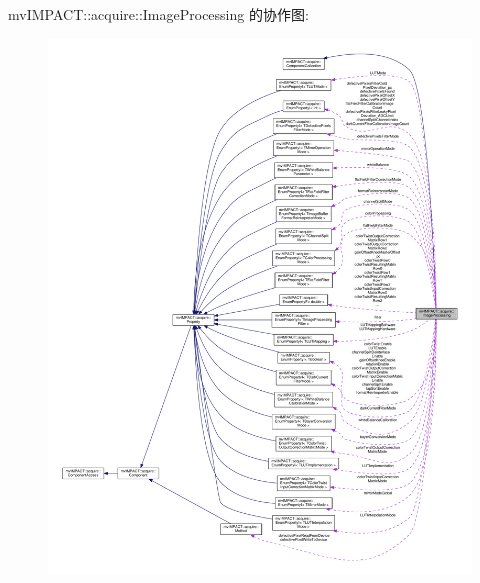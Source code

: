 mv\+I\+M\+P\+A\+C\+T\+:\+:acquire\+:\+:Image\+Processing 的协作图\+:
\nopagebreak
\begin{figure}[H]
\begin{center}
\leavevmode
\includegraphics[width=350pt]{classmv_i_m_p_a_c_t_1_1acquire_1_1_image_processing__coll__graph}
\end{center}
\end{figure}
